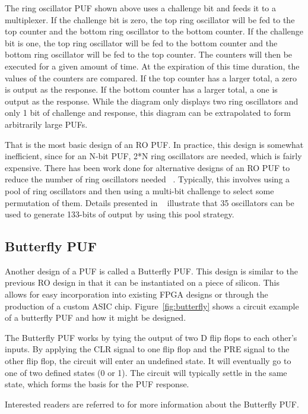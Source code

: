 The ring oscillator PUF shown above uses a challenge bit and feeds it to a multiplexer.
If the challenge bit is zero, the top ring oscillator will be fed to the top counter and
the bottom ring oscillator to the bottom counter. If the challenge bit is one, the top
ring oscillator will be fed to the bottom counter and the bottom ring oscillator will
be fed to the top counter. The counters will then be executed for a given amount of time.
At the expiration of this time duration, the values of the counters are compared. If the
top counter has a larger total, a zero is output as the response. If the bottom counter
has a larger total, a one is output as the response. 
While the diagram only displays two ring oscillators and only 1 bit of challenge and
response, this diagram can be extrapolated to form arbitrarily large PUFs.

That is the most basic design of an RO PUF. In practice, this design is somewhat 
inefficient, since for an N-bit PUF, 2*N ring oscillators are needed, which is fairly
expensive. There has been work done for alternative designs of
an RO PUF to reduce the number of ring oscillators needed ~\cite{aegis_pool}. 
Typically, this involves using
a pool of ring oscillators and then using a multi-bit challenge to select some permutation
of them. Details presented in ~\cite{aegis_pool} illustrate that 35 oscillators can
be used to generate 133-bits of output by using this pool strategy.

\subsection{Butterfly PUF}
Another design of a PUF is called a Butterfly PUF. This design is similar to the previous
RO design in that it can be instantiated on a piece of silicon. This allows for easy
incorporation into existing FPGA designs or through the production of a custom ASIC chip.
Figure~\ref{fig:butterfly} shows a circuit example of a butterfly PUF and how it might be
designed.

The Butterfly PUF works by tying the output of two D flip flops to each other's inputs. By applying
the CLR signal to one flip flop and the PRE signal to the other flip flop, the circuit will enter an
undefined state. It will eventually go to one of two defined states (0 or 1). The circuit will typically
settle in the same state, which forms the basis for the PUF response.

Interested readers are referred to \cite{butterflypuf} for more information about the Butterfly PUF.

